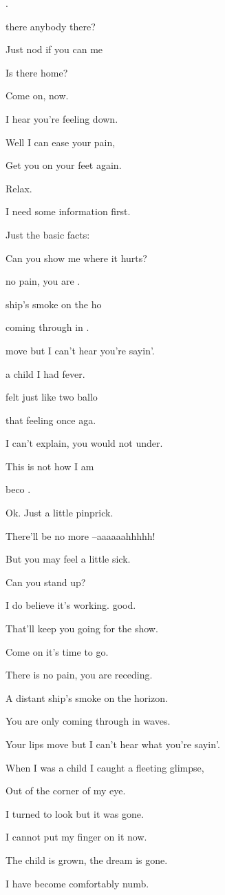 
\zs
{}.

 there anybody there? 

Just nod if you can  me

Is there  home? 
\ks

\zs
Come on, now.

I hear you’re feeling down.

Well I can ease your pain,

Get you on your feet again.
\ks

\zs
Relax.

I need some information first.

Just the basic facts:

Can you show me where it hurts? 
\ks

\zr
{} no pain, you are .

 ship’s smoke on the ho

 coming through in .

 move but I can’t hear  you’re sayin’.

 a child I had fever.

 felt just like two ballo

 that feeling once aga.

I can’t explain, you would not under.

This is not how I am

  beco .
\kr

\zs
Ok.
Just a little pinprick.

There’ll be no more --aaaaaahhhhh!

But you may feel a little sick.
\ks

\zs
Can you stand up? 

I do believe it’s working. good.

That’ll keep you going for the show.

Come on it’s time to go.
\ks

\zr
There is no pain, you are receding.

A distant ship’s smoke on the horizon.

You are only coming through in waves.

Your lips move but I can’t hear what you’re sayin’.

When I was a child I caught a fleeting glimpse,

Out of the corner of my eye.

I turned to look but it was gone.

I cannot put my finger on it now.

The child is grown, the dream is gone.

I have become comfortably numb.
\kr
\kp

